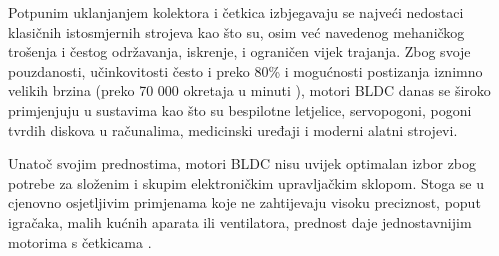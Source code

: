 \documentclass[diplomskirad, upload]{fer}
\begin{document}
Potpunim uklanjanjem kolektora i četkica izbjegavaju se najveći nedostaci
klasičnih istosmjernih strojeva kao što su, osim već navedenog mehaničkog
trošenja i čestog održavanja, iskrenje, i ograničen vijek trajanja. Zbog svoje
pouzdanosti, učinkovitosti često i preko 80\% \cite{motor-ucinkovitost} i
mogućnosti postizanja iznimno velikih brzina (preko 70 000 okretaja u minuti
\cite{motor-rpm}), motori BLDC danas se široko primjenjuju u sustavima kao što
su bespilotne letjelice, servopogoni, pogoni tvrdih diskova u računalima,
medicinski uređaji i moderni alatni strojevi.

Unatoč svojim prednostima, motori BLDC nisu uvijek optimalan izbor zbog potrebe
za složenim i skupim elektroničkim upravljačkim sklopom. Stoga se u cjenovno
osjetljivim primjenama koje ne zahtijevaju visoku preciznost, poput igračaka,
malih kućnih aparata ili ventilatora, prednost daje jednostavnijim motorima s
četkicama \cite{HughesDrury2013}.

\newpage
\end{document}

